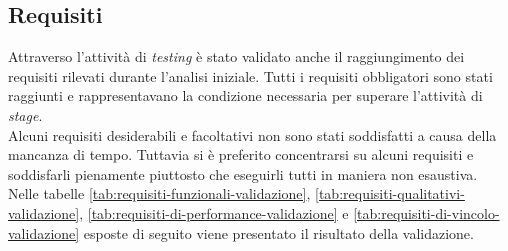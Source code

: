 \subsection{Requisiti}
\label{sec:validazione-requisiti}
\noindent Attraverso l’attività di \textit{testing} è stato validato anche il raggiungimento dei requisiti rilevati
durante l'analisi iniziale.
Tutti i requisiti obbligatori sono stati raggiunti e rappresentavano la condizione
necessaria per superare l'attività di \textit{stage}.\\
Alcuni requisiti desiderabili e facoltativi non sono stati soddisfatti a causa della mancanza di tempo.
Tuttavia si è preferito concentrarsi su alcuni requisiti e soddisfarli pienamente
piuttosto che eseguirli tutti in maniera non esaustiva.
Nelle tabelle \ref{tab:requisiti-funzionali-validazione}, \ref{tab:requisiti-qualitativi-validazione}, \ref{tab:requisiti-di-performance-validazione} e \ref{tab:requisiti-di-vincolo-validazione} esposte di seguito viene presentato il risultato della validazione.

